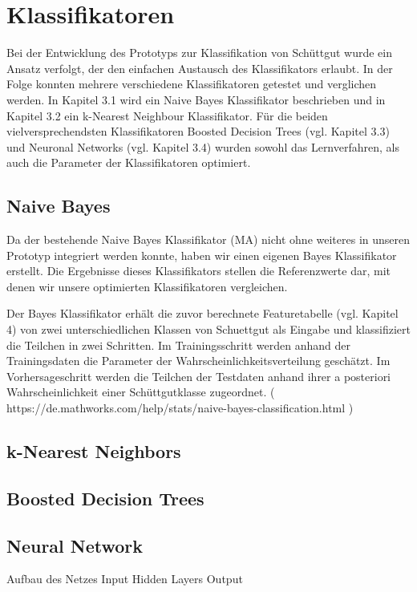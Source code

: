 \section{Klassifikatoren}
Bei der Entwicklung des Prototyps zur Klassifikation von Schüttgut wurde ein Ansatz verfolgt, der den einfachen Austausch des Klassifikators erlaubt. In der Folge konnten mehrere verschiedene Klassifikatoren getestet und verglichen werden. In Kapitel 3.1 wird ein Naive Bayes Klassifikator beschrieben und in Kapitel 3.2 ein k-Nearest Neighbour Klassifikator. Für die beiden vielversprechendsten Klassifikatoren Boosted Decision Trees (vgl. Kapitel 3.3) und Neuronal Networks (vgl. Kapitel 3.4) wurden sowohl das Lernverfahren, als auch die Parameter der Klassifikatoren optimiert.

\subsection{Naive Bayes}
Da der bestehende Naive Bayes Klassifikator (MA) nicht ohne weiteres in unseren Prototyp integriert werden konnte, haben wir einen eigenen Bayes Klassifikator erstellt. Die Ergebnisse dieses Klassifikators stellen die Referenzwerte dar, mit denen wir unsere optimierten Klassifikatoren vergleichen.

Der Bayes Klassifikator erhält die zuvor berechnete Featuretabelle (vgl. Kapitel 4) von zwei unterschiedlichen Klassen von Schuettgut als Eingabe und klassifiziert die Teilchen in zwei Schritten. Im Trainingsschritt werden anhand der Trainingsdaten die Parameter der Wahrscheinlichkeitsverteilung geschätzt. Im Vorhersageschritt werden die Teilchen der Testdaten anhand ihrer a posteriori Wahrscheinlichkeit einer Schüttgutklasse zugeordnet. ( https://de.mathworks.com/help/stats/naive-bayes-classification.html )


\subsection{k-Nearest Neighbors}

\subsection{Boosted Decision Trees}

\subsection{Neural Network}

Aufbau des Netzes
Input
Hidden Layers
Output

